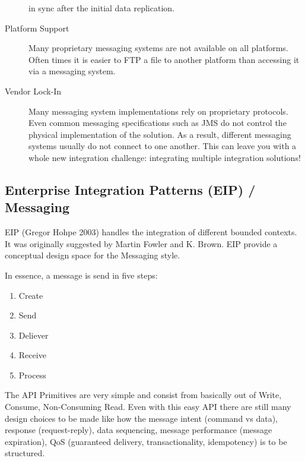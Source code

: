 \documentclass[../Main.tex]{subfiles}
\begin{document}
\begin{description}
    in sync after the initial data replication.
    \item[Platform Support]  Many proprietary messaging systems are not available on all platforms. Often times it is easier to FTP a 
    file to another platform than accessing it via a messaging system.
    \item[Vendor Lock-In] Many messaging system implementations rely on proprietary protocols. Even common messaging 
    specifications such as JMS do not control the physical implementation of the solution. As a result, 
    different messaging systems usually do not connect to one another. This can leave you with a whole 
    new integration challenge: integrating multiple integration solutions!
\end{description}

\newpage
\subsection{Enterprise Integration Patterns (EIP) / Messaging}
EIP (Gregor Hohpe 2003) handles the integration of different bounded contexts.
It was originally suggested by Martin Fowler and K. Brown.
EIP provide a conceptual design space for the Messaging style.

\begin{multicols}{2}
    In essence, a message is send in five steps:
    \begin{enumerate}
        \item Create
        \item Send
        \item Deliever
        \item Receive
        \item Process
    \end{enumerate}

    The API Primitives are very simple and consist from basically out of Write, Consume, Non-Consuming Read.
    Even with this easy API there are still many design choices to be made like
    how the message intent (command vs data), response (request-reply), data sequencing, message performance (message expiration),
    QoS (guaranteed delivery, transactionality, idempotency) is to be structured.
\end{multicols}
\end{document}
